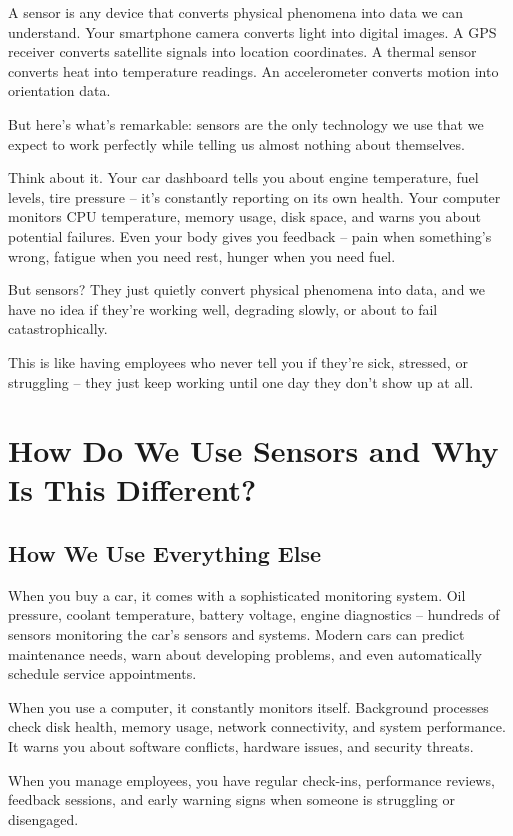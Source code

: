 \documentclass[11pt,letterpaper]{article}
\begin{document}
A sensor is any device that converts physical phenomena into data we can understand. Your smartphone camera converts light into digital images. A GPS receiver converts satellite signals into location coordinates. A thermal sensor converts heat into temperature readings. An accelerometer converts motion into orientation data.

But here's what's remarkable: sensors are the only technology we use that we expect to work perfectly while telling us almost nothing about themselves.

Think about it. Your car dashboard tells you about engine temperature, fuel levels, tire pressure – it's constantly reporting on its own health. Your computer monitors CPU temperature, memory usage, disk space, and warns you about potential failures. Even your body gives you feedback – pain when something's wrong, fatigue when you need rest, hunger when you need fuel.

But sensors? They just quietly convert physical phenomena into data, and we have no idea if they're working well, degrading slowly, or about to fail catastrophically.

This is like having employees who never tell you if they're sick, stressed, or struggling – they just keep working until one day they don't show up at all.

\section*{How Do We Use Sensors and Why Is This Different?}

\subsection*{How We Use Everything Else}

When you buy a car, it comes with a sophisticated monitoring system. Oil pressure, coolant temperature, battery voltage, engine diagnostics – hundreds of sensors monitoring the car's sensors and systems. Modern cars can predict maintenance needs, warn about developing problems, and even automatically schedule service appointments.

When you use a computer, it constantly monitors itself. Background processes check disk health, memory usage, network connectivity, and system performance. It warns you about software conflicts, hardware issues, and security threats.

When you manage employees, you have regular check-ins, performance reviews, feedback sessions, and early warning signs when someone is struggling or disengaged.
\end{document}
